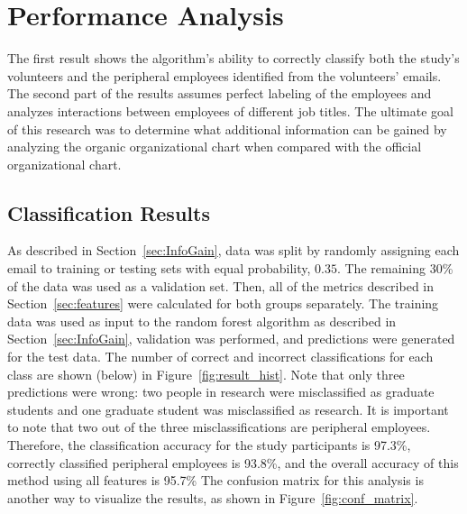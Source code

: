 \documentclass[12pt]{report}
\begin{document}
\chapter{Performance Analysis} \label{Performance}
The first result shows the algorithm's ability to correctly classify both the study's volunteers and the peripheral employees identified from the volunteers' emails.
The second part of the results assumes perfect labeling of the employees and analyzes interactions between employees of different job titles.
The ultimate goal of this research was to determine what additional information can be gained by analyzing the organic organizational chart when compared with the official organizational chart.

\section{Classification Results} \label{ssec:classification_results}
As described in Section~\ref{sec:InfoGain}, data was split by randomly assigning each email to training or testing sets with equal probability, $0.35$.
The remaining 30\% of the data was used as a validation set.
Then, all of the metrics described in Section~\ref{sec:features} were calculated for both groups separately.
The training data was used as input to the random forest algorithm as described in Section~\ref{sec:InfoGain}, validation was performed, and predictions were generated for the test data.
The number of correct and incorrect classifications for each class are shown (below) in Figure~\ref{fig:result_hist}.
Note that only three predictions were wrong: two people in research were misclassified as graduate students and one graduate student was misclassified as research.
It is important to note that two out of the three misclassifications are peripheral employees.
Therefore, the classification accuracy for the study participants is 97.3\%, correctly classified peripheral employees is 93.8\%, and the overall accuracy of this method using all features is 95.7\%
The confusion matrix for this analysis is another way to visualize the results, as shown in Figure~\ref{fig:conf_matrix}.
\end{document}
